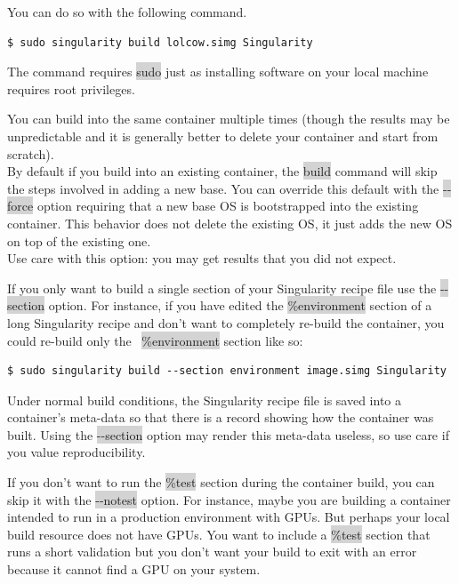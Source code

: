 \documentclass[a4paper]{article}
\newcounter{subsubsubsection}[subsubsection]
\begin{document}
You can do so with the following command.	

\begin{lstlisting}[frame=single] 
$ sudo singularity build lolcow.simg Singularity 
\end{lstlisting}

The command requires \colorbox{lightgray}{sudo} just as installing software on your local machine requires root privileges.

	You can build into the same container multiple times (though the results may be unpredictable and it is generally better to delete your container and start from scratch).\\[0.1in]
By default if you build into an existing container, the \colorbox{lightgray}{build} command will skip the steps involved in adding a new base. You can override this default with the \colorbox{lightgray}{-{}-force} option requiring that a new base OS is bootstrapped into the existing container. This behavior does not delete the existing OS, it just adds the new OS on top of the existing one.\\[0.1in]
Use care with this option: you may get results that you did not expect.

	
	If you only want to build a single section of your Singularity recipe file use the  \colorbox{lightgray}{-{}-section} option. For instance, if you have edited the \colorbox{lightgray}{\%environment} section of a long Singularity recipe and don’t want to completely re-build the container, you could re-build only the \ \colorbox{lightgray}{\%environment} section like so:
	
\begin{lstlisting}[frame=single] 
$ sudo singularity build --section environment image.simg Singularity
\end{lstlisting}	
	
Under normal build conditions, the Singularity recipe file is saved into a container’s meta-data so that there is a record showing how the container was built. Using the \colorbox{lightgray}{-{}-section} option may render this meta-data useless, so use care if you value reproducibility.

	
If you don’t want to run the \colorbox{lightgray}{\%test} section during the container build, you can skip it with the \colorbox{lightgray}{-{}-notest} option. For instance, maybe you are building a container intended to run in a production environment with GPUs. But perhaps your local build resource does not have GPUs. You want to include a \colorbox{lightgray}{\%test} section that runs a short validation but you don’t want your build to exit with an error because it cannot find a GPU on your system.
\end{document}
